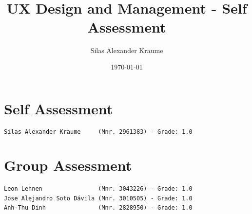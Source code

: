 \documentclass{report}
\title{\Huge{UX Design and Management - Self Assessment}}
\author{\huge{Silas Alexander Kraume}}
\date{\today}
\begin{document}
\maketitle
\newpage

\tableofcontents
\newpage

\chapter{Self Assessment}

\begin{verbatim}
Silas Alexander Kraume     (Mnr. 2961383) - Grade: 1.0
\end{verbatim}


\chapter{Group Assessment}

\begin{verbatim}
Leon Lehnen                (Mnr. 3043226) - Grade: 1.0
Jose Alejandro Soto Dávila (Mnr. 3010505) - Grade: 1.0
Anh-Thu Dinh               (Mnr. 2828950) - Grade: 1.0
\end{verbatim}
\end{document}
